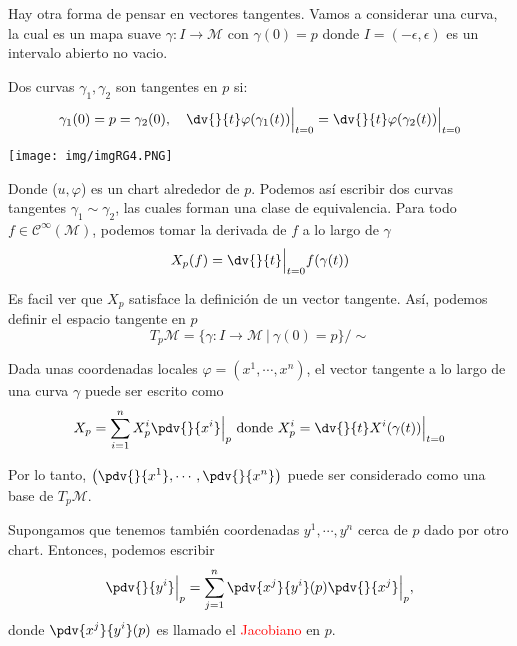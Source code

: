 \documentclass[../main]{subfiles}
\begin{document}
\begin{adjustwidth}{0pt}{-100pt}
Hay otra forma de pensar en vectores tangentes. Vamos a considerar una curva, la cual es un mapa suave $\gamma:I \rightarrow \mathcal{M}$ con $\gamma(0)=p$ donde $I=(-\epsilon, \epsilon)$ es un intervalo abierto no vacio. 

Dos curvas $\gamma_1, \gamma_2$ son tangentes en $p$ si:
\begin{equation}
    \gamma_1(0)=p=\gamma_2(0),\quad \dv{}{t}\varphi(\gamma_1(t))\Big{|}_{t=0}=\dv{}{t}\varphi(\gamma_2(t))\Big{|}_{t=0}
\end{equation}
\begin{center}
    \texttt{[image: img/imgRG4.PNG]}
\end{center}

Donde ($u, \varphi$) es un chart alrededor de $p$. Podemos así escribir dos curvas tangentes $\gamma_1 \sim \gamma_2$, las cuales forman una clase de equivalencia. Para todo $f \in \mathcal{C}^{\infty}(\mathcal{M})$, podemos tomar la derivada de $f$ a lo largo de $\gamma$
\begin{equation}
    X_p(f)=\dv{}{t}\Big{|}_{t=0} f(\gamma(t))
\end{equation}

Es facil ver que $X_p$ satisface la definición de un vector tangente. Así, podemos definir el espacio tangente en $p$
\begin{equation}
    T_p \mathcal{M}=\{\gamma: I\rightarrow \mathcal{M}\ | \ \gamma(0)=p\}/\sim
\end{equation}

Dada unas coordenadas locales $\varphi=(x^1, \cdots, x^n)$, el vector tangente a lo largo de una curva $\gamma$ puede ser escrito como 
\begin{equation}
    X_p=\sum_{i=1}^n X^{i}_p \pdv{}{x^{i}}\Big{|}_p \ \text{donde} \ X^{i}_p=\dv{}{t}X^{i}(\gamma(t))\Big{|}_{t=0}
\end{equation}

Por lo tanto, $\left(\displaystyle \pdv{}{x^1}, \cdots, \pdv{}{x^n}\right)$ puede ser considerado como una base de $T_p\mathcal{M}$.

Supongamos que tenemos también coordenadas $y^1, \cdots, y^n$ cerca de $p$ dado por otro chart. Entonces, podemos escribir 
\begin{equation}
    \pdv{}{y^{i}}\Big{|}_p=\sum_{j=1}^n \pdv{x^j}{y^{i}}(p)\pdv{}{x^j}\Big{|}_p,
\end{equation}
donde $\displaystyle \pdv{x^j}{y^{i}}(p)$ es llamado el \textcolor{red}{Jacobiano} en $p$.


\end{adjustwidth}
\end{document}
